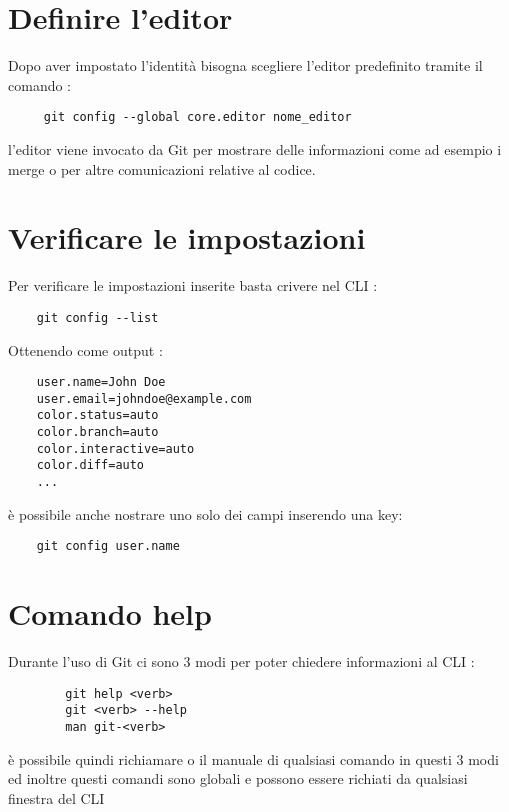 \section{Definire l'editor}
Dopo aver impostato l'identità bisogna scegliere l'editor predefinito tramite il comando : 
\begin{lstlisting}
	 git config --global core.editor nome_editor
\end{lstlisting}
l'editor viene invocato da Git per mostrare delle informazioni come ad esempio i merge o per altre comunicazioni relative al codice.
\section{Verificare le impostazioni}
Per verificare le impostazioni inserite basta crivere nel CLI :
\begin{lstlisting}
	git config --list
\end{lstlisting}
Ottenendo come output :
\begin{lstlisting}
	user.name=John Doe
	user.email=johndoe@example.com
	color.status=auto
	color.branch=auto
	color.interactive=auto
	color.diff=auto
	...
\end{lstlisting}
è possibile anche nostrare uno solo dei campi inserendo una key:
\begin{lstlisting}
	git config user.name
\end{lstlisting}
\section{Comando help}
Durante l'uso di Git ci sono 3 modi per poter chiedere informazioni al CLI :
\begin{lstlisting}
		git help <verb>
		git <verb> --help
		man git-<verb>
\end{lstlisting}
è possibile quindi richiamare o il manuale di qualsiasi comando in questi 3 modi ed inoltre questi comandi sono globali e possono essere richiati da qualsiasi finestra del CLI





